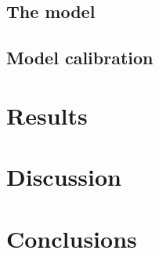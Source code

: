 \documentclass{article}
\begin{document}
\subsection{The model}


\subsection{Model calibration}


\section{Results}

\section{Discussion}

\section{Conclusions}
\end{document}

